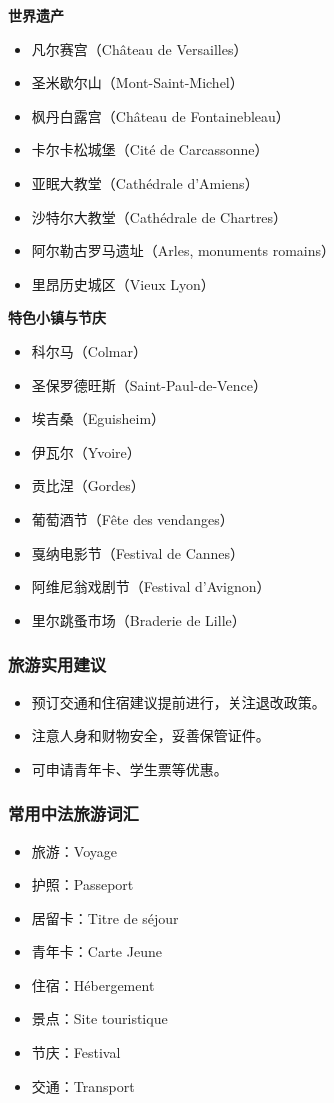 \textbf{世界遗产}
\begin{itemize}
    \item 凡尔赛宫（Château de Versailles）
    \item 圣米歇尔山（Mont-Saint-Michel）
    \item 枫丹白露宫（Château de Fontainebleau）
    \item 卡尔卡松城堡（Cité de Carcassonne）
    \item 亚眠大教堂（Cathédrale d’Amiens）
    \item 沙特尔大教堂（Cathédrale de Chartres）
    \item 阿尔勒古罗马遗址（Arles, monuments romains）
    \item 里昂历史城区（Vieux Lyon）
\end{itemize}

\textbf{特色小镇与节庆}
\begin{itemize}
    \item 科尔马（Colmar）
    \item 圣保罗德旺斯（Saint-Paul-de-Vence）
    \item 埃吉桑（Eguisheim）
    \item 伊瓦尔（Yvoire）
    \item 贡比涅（Gordes）
    \item 葡萄酒节（Fête des vendanges）
    \item 戛纳电影节（Festival de Cannes）
    \item 阿维尼翁戏剧节（Festival d’Avignon）
    \item 里尔跳蚤市场（Braderie de Lille）
\end{itemize}

\subsubsection{旅游实用建议}
\begin{itemize}
    \item 预订交通和住宿建议提前进行，关注退改政策。
    \item 注意人身和财物安全，妥善保管证件。
    \item 可申请青年卡、学生票等优惠。
\end{itemize}

\subsubsection{常用中法旅游词汇}
\begin{itemize}
    \item 旅游：Voyage
    \item 护照：Passeport
    \item 居留卡：Titre de séjour
    \item 青年卡：Carte Jeune
    \item 住宿：Hébergement
    \item 景点：Site touristique
    \item 节庆：Festival
    \item 交通：Transport
\end{itemize}
